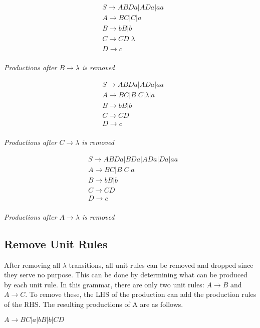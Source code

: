 \documentclass{assignment-x}
\begin{document}
\begin{multicols}{3}
    \begin{align*}
        &S \rightarrow ABDa|ADa|aa\\
        &A \rightarrow BC|C|a\\
        &B \rightarrow bB|b\\
        &C \rightarrow CD|\lambda\\
        &D \rightarrow c\\
    \end{align*}
    \begin{center}
        \textit{Productions after $B \rightarrow \lambda$ is removed}
    \end{center}
\columnbreak
    
    \begin{align*}
        &S \rightarrow ABDa|ADa|aa\\
        &A \rightarrow BC|B|C|\lambda|a\\
        &B \rightarrow bB|b\\
        &C \rightarrow CD\\
        &D \rightarrow c\\
    \end{align*}
    \begin{center}
        \textit{Productions after $C \rightarrow \lambda$ is removed}
    \end{center}
\columnbreak
    
    \begin{align*}
        &S \rightarrow ABDa|BDa|ADa|Da|aa\\
        &A \rightarrow BC|B|C|a\\
        &B \rightarrow bB|b\\
        &C \rightarrow CD\\
        &D \rightarrow c\\
    \end{align*}
    \begin{center}
        \textit{Productions after $A \rightarrow \lambda$ is removed}
    \end{center}
\end{multicols}
\pagebreak

\subsection{Remove Unit Rules}
After removing all $\lambda$ transitions, all unit rules can be removed and dropped since they serve no purpose.
This can be done by determining what can be produced by each unit rule.
In this grammar, there are only two unit rules: $A \rightarrow B$ and $A \rightarrow C$.
To remove these, the LHS of the production can add the production rules of the RHS.
The resulting productions of A are as follows.
\begin{center}
    $A \rightarrow BC|a|bB|b|CD$
\end{center}
\end{document}
